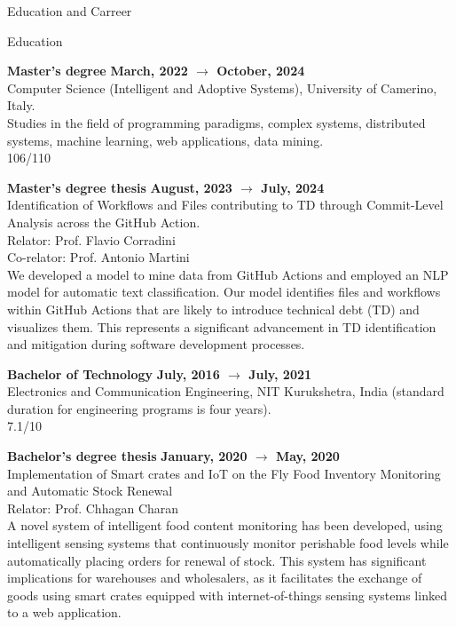 \documentclass{resume} %
\begin{document}
\begin{rSection}{Education and Carreer}
\begin{rSubsection2}{Education}
            \item\textbf{ Master's degree }\hfill \textbf{March, 2022 $\rightarrow$ October, 2024}
            \\Computer Science (Intelligent and Adoptive Systems), University of Camerino, Italy.
            \\Studies in the field of programming paradigms, complex systems, distributed systems, machine learning, web applications, data mining.
            \\106/110
            \item\textbf{ Master's degree thesis }\hfill \textbf{August, 2023 $\rightarrow$ July, 2024}
            \\Identification of Workflows and Files contributing to TD through Commit-Level Analysis across the GitHub Action.
            \\Relator: Prof. Flavio Corradini
            \\Co-relator: Prof. Antonio Martini
            \\We developed a model to mine data from GitHub Actions and employed an NLP model for automatic text classification.
            Our model identifies files and workflows within GitHub Actions that are likely to introduce technical debt (TD) and visualizes them.
            This represents a significant advancement in TD identification and mitigation during software development processes.
            \item\textbf{ Bachelor of Technology }\hfill \textbf{July, 2016 $\rightarrow$ July, 2021}
            \\Electronics and Communication Engineering, NIT Kurukshetra, India (standard duration for engineering programs is four years).
            \\7.1/10
            \item\textbf{ Bachelor's degree thesis }\hfill \textbf{January, 2020 $\rightarrow$ May, 2020}
            \\Implementation of Smart crates and IoT on the Fly Food Inventory Monitoring and Automatic Stock Renewal
            \\Relator: Prof. Chhagan Charan
            \\A novel system of intelligent food content monitoring has been developed, using intelligent sensing systems that continuously monitor perishable food levels while automatically placing orders for renewal of stock.
            This system has significant implications for warehouses and wholesalers, as it facilitates the exchange of goods using smart crates equipped with internet-of-things sensing systems linked to a web application.
        \end{rSubsection2}


\end{rSection}
\end{document}
